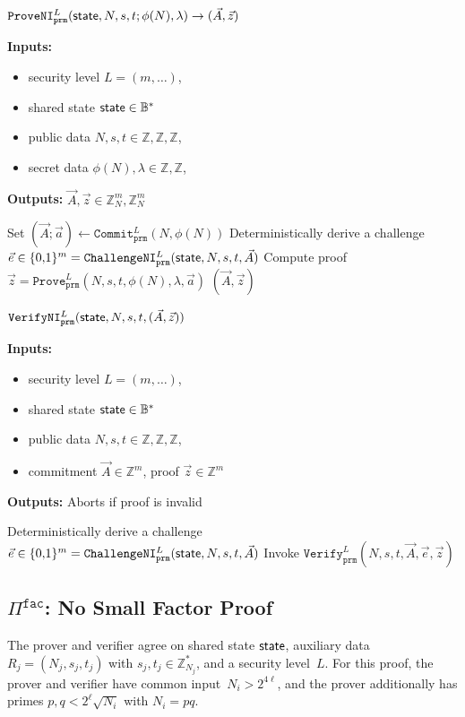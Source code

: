\documentclass[11pt]{article}
\newenvironment{inlineAlgorithm}{}{}
\newcommand{\algoName}[1]{#1 \par}
\newcommand{\algoInputsList}[1]{
    {\small \bf Inputs:} 
        \begin{itemize}[noitemsep,topsep=0pt]
            #1
        \end{itemize}
}
\newcommand{\algoOutputs}[1]{
    {\small \bf Outputs:} #1 \par
}
\def\state{{\sf state}}
\newcommand{\proof}[1]{\ensuremath{\Pi^{\mathtt{#1}}}}
\newcommand{\challengeni}[1]{\ensuremath{\mathtt{ChallengeNI}_{\mathtt{#1}}}}
\newcommand{\proveni}[1]{\ensuremath{\mathtt{ProveNI}_{\mathtt{#1}}}}
\newcommand{\verifyni}[1]{\ensuremath{\mathtt{VerifyNI}_{\mathtt{#1}}}}
\newcommand{\Z}{\mathbb{Z}}
\newcommand{\?}[1]{\stackrel{?}{#1}}
\newcommand{\Bit}{\ensuremath{\{0{,}1\}}}
\newcommand{\Byte}{\ensuremath{\mathbb{B}}}
\begin{document}
\begin{description}

\item
\begin{inlineAlgorithm}
\algoName{$\proveni{prm}^L(\state, N, s, t; \phi(N), \lambda) \to (\vec A, \vec z)$}
\algoInputsList{
    \item security level $L = (m, \dots)$,
    \item shared state $\state \in \Byte^*$
    \item public data $N, s, t \in \Z, \Z, \Z$,
    \item secret data $\phi(N), \lambda \in \Z, \Z$,
}
\algoOutputs{$\vec A, \vec z \in \Z_N^m, \Z_N^m$}
\begin{algorithmic}[1]
\State Set $(\vec A; \vec a) \gets \mathtt{Commit}_\mathtt{prm}^L(N, \phi(N))$
\State Deterministically derive a challenge $\vec e \in \Bit^m = \challengeni{prm}^L(\state, N, s, t, \vec A)$
\State Compute proof $\vec z = \mathtt{Prove}_\mathtt{prm}^L(N, s, t, \phi(N), \lambda, \vec a)$
\State \Return $(\vec A, \vec z)$
\end{algorithmic}
\end{inlineAlgorithm}

\item
\begin{inlineAlgorithm}
\algoName{$\verifyni{prm}^L(\state, N, s, t, (\vec A, \vec z))$}
\algoInputsList{
    \item security level $L = (m, \dots)$,
    \item shared state $\state \in \Byte^*$
    \item public data $N, s, t \in \Z, \Z, \Z$,
    \item commitment $\vec A \in \Z^m$, proof $\vec z \in \Z^m$
}
\algoOutputs{Aborts if proof is invalid}
\begin{algorithmic}[1]
\State Deterministically derive a challenge $\vec e \in \Bit^m = \challengeni{prm}^L(\state, N, s, t, \vec A)$
\State Invoke $\mathtt{Verify}_\mathtt{prm}^L(N, s, t, \vec A, \vec e, \vec z)$
\end{algorithmic}
\end{inlineAlgorithm}

\end{description}


\subsection{$\proof{fac}$: No Small Factor Proof}
The prover and verifier agree on shared state $\state$, auxiliary data $R_j=(N_j, s_j, t_j)$ with $s_j, t_j \in {\mathbb Z}_{N_j}^*$, and a security level~$L$. 
For this proof, the prover and verifier have common input~$N_i > 2^{4 \ell}$, and the prover additionally has primes $p, q < 2^\ell \sqrt{N_i}$ with $N_i=pq$.
\end{document}
